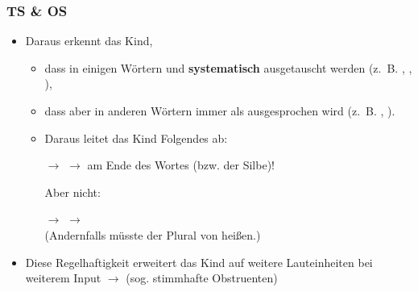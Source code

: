 \begin{frame}
	\frametitle{TS \& OS}
		
\begin{itemize}
	\item Daraus erkennt das Kind,
	
	\begin{itemize}
		\item dass in einigen Wörtern \textipa{[d]} und \textipa{[t]} \textbf{systematisch} ausgetauscht werden (z.~B. , , ),
		\item dass aber in anderen Wörtern \textipa{[t]} immer als \textipa{[t]} ausgesprochen wird  (z.~B. , ).
		\item[]
		\item Daraus leitet das Kind Folgendes ab:
		\item[$\rightarrow$]  $\rightarrow$ \textipa{[t]} am Ende des Wortes (bzw. der Silbe)!
		\item[]
		\item[] Aber nicht:
		\item[]
		\item[$\rightarrow$]  $\rightarrow$ \textipa{[d]}\\ (Andernfalls müsste der Plural von   heißen.)
	\end{itemize}
	
	\item[]
	\item Diese Regelhaftigkeit erweitert das Kind auf weitere Lauteinheiten bei weiterem Input $\rightarrow$ 	(sog. stimmhafte Obstruenten)
\end{itemize}

\end{frame}
	



